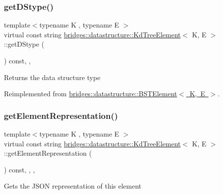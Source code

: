 \subsubsection{\texorpdfstring{getDStype()}{getDStype()}}
{\footnotesize\ttfamily template$<$typename K , typename E $>$ \\
virtual const string \mbox{\hyperlink{classbridges_1_1datastructure_1_1_kd_tree_element}{bridges\+::datastructure\+::\+Kd\+Tree\+Element}}$<$ K, E $>$\+::get\+D\+Stype (\begin{DoxyParamCaption}{ }\end{DoxyParamCaption}) const\hspace{0.3cm}{\ttfamily [inline]}, {\ttfamily [override]}, {\ttfamily [virtual]}}

\begin{DoxyReturn}{Returns}
the data structure type 
\end{DoxyReturn}


Reimplemented from \mbox{\hyperlink{classbridges_1_1datastructure_1_1_b_s_t_element_a2bb8cc9ec4b6bc5b89ecef0f17be366f}{bridges\+::datastructure\+::\+B\+S\+T\+Element$<$ K, E $>$}}.

\mbox{\label{classbridges_1_1datastructure_1_1_kd_tree_element_a5413ecaf152e3df5fb45dd85da812888}} 
\subsubsection{\texorpdfstring{getElementRepresentation()}{getElementRepresentation()}}
{\footnotesize\ttfamily template$<$typename K , typename E $>$ \\
virtual const string \mbox{\hyperlink{classbridges_1_1datastructure_1_1_kd_tree_element}{bridges\+::datastructure\+::\+Kd\+Tree\+Element}}$<$ K, E $>$\+::get\+Element\+Representation (\begin{DoxyParamCaption}{ }\end{DoxyParamCaption}) const\hspace{0.3cm}{\ttfamily [inline]}, {\ttfamily [override]}, {\ttfamily [protected]}, {\ttfamily [virtual]}}

Gets the J\+S\+ON representation of this element 

